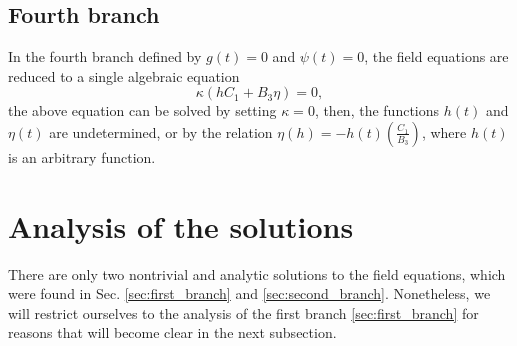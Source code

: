 \documentclass[epj]{svjour}
\begin{document}
\subsection{Fourth branch}

In the fourth branch defined by $g(t) = 0$ and $\psi (t) = 0$, the field equations are reduced
to a single algebraic equation
\begin{equation}
    \kappa\left(hC_1 + B_3\eta\right) = 0,
\end{equation}
the above equation can be solved by setting $\kappa = 0$, then, the functions $h(t)$ and $\eta(t)$ are undetermined,
or by the relation $\eta(h) = - h(t)\left(\frac{C_1}{B_3}\right)$, where $h(t)$ is an arbitrary function.

\section{Analysis of the solutions}
\label{sec:analysis}

There are only two nontrivial and analytic solutions to the field equations, which were found
in Sec. \ref{sec:first_branch} and \ref{sec:second_branch}. Nonetheless, 
we will restrict ourselves to the analysis of the first branch \ref{sec:first_branch} for reasons that will become clear in the next subsection.
\end{document}
